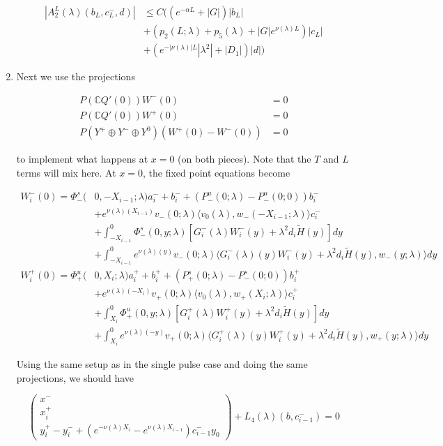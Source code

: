 \documentclass[12pt]{article}
\def\C{{\mathbb C}}
\begin{document}
\begin{enumerate}
\begin{align*}
|A_2^L(\lambda)(b_L, c_L^-, d)| &\leq C ( ( e^{-\alpha L} + |G|)|b_L| \\
&+ ( p_2(L; \lambda) + p_5(\lambda) + |G|e^{\nu(\lambda)L})|c_L| \\
&+ (e^{-|\nu(\lambda)|L}|\lambda^2| + |D_1|)|d|)
\end{align*}

\item Next we use the projections 

\begin{align*}
P(\C Q'(0))W^-(0) &= 0 \\
P(\C Q'(0))W^+(0) &= 0 \\
P(Y^+ \oplus Y^- \oplus Y^0) (W^+(0) - W^-(0) ) &= 0
\end{align*}

to implement what happens at $x = 0$ (on both pieces). Note that the $T$ and $L$ terms will mix here. At $x = 0$, the fixed point equations become

\begin{align*}
W_i^-(0) = \Phi^s_-(&0, -X_{i-1}; \lambda)a_i^- + b_i^- + (P^u_-(0; \lambda) - P^u_-(0; 0))b_i^- \\
&+ e^{\nu(\lambda)(X_{i-1})} v_-(0; \lambda) \langle v_0(\lambda), w_-(-X_{i-1}; \lambda) \rangle c_i^- \\
&+ \int_{-X_{i-1}}^0 \Phi^s_-(0, y; \lambda) [ G_i^-(\lambda)W_i^-(y) + \lambda^2 d_i \tilde{H}(y) ] dy \\
&+ \int_{-X_{i-1}}^0
e^{\nu(\lambda)(y)} v_-(0; \lambda) \langle G_i^-(\lambda)(y)W_i^-(y) + \lambda^2 d_i \tilde{H}(y), w_-(y; \lambda) \rangle dy \\
W_i^+(0) = \Phi^u_+(&0, X_i; \lambda)a_i^+ + b_i^+ + (P^s_+(0; \lambda) - P^s_-(0; 0))b_i^+ \\
&+ e^{\nu(\lambda)(-X_i)} v_+(0; \lambda) \langle v_0(\lambda), w_+(X_i; \lambda) \rangle c_i^+ \\
&+ \int_{X_i}^0 \Phi^u_+(0, y; \lambda) [ G_i^+(\lambda)W_i^+(y) + \lambda^2 d_i \tilde{H}(y) ] dy \\
&+ \int_{X_i}^0 e^{\nu(\lambda)(-y)} v_+(0; \lambda) \langle G_i^+(\lambda)(y)W_i^+(y) + \lambda^2 d_i \tilde{H}(y), w_+(y; \lambda) \rangle dy
\end{align*}

Using the same setup as in the single pulse case and doing the same projections, we should have

\[
\begin{pmatrix}x^- \\ x_i^+ \\ y_i^+ - y_i^- + (e^{-\nu(\lambda)X_i} - e^{\nu(\lambda)X_{i-1}}) c_{i-1}^- y_0 \end{pmatrix} + L_4(\lambda)(b, c_{i-1}^-) = 0
\]


\end{enumerate}
\end{document}
